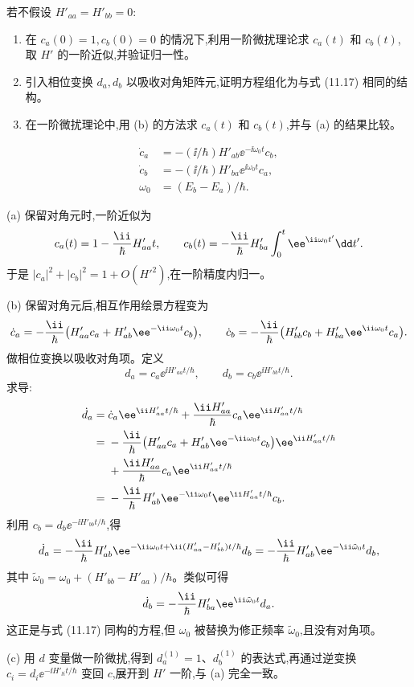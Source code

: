 \begin{question}
若不假设 $H'_{aa}=H'_{bb}=0$:
\begin{enumerate}
\item 在 $c_a(0)=1,c_b(0)=0$ 的情况下,利用一阶微扰理论求 $c_a(t)$ 和 $c_b(t)$,取 $H'$ 的一阶近似,并验证归一性。
\item 引入相位变换 $d_a,d_b$ 以吸收对角矩阵元,证明方程组化为与式 (11.17) 相同的结构。
\item 在一阶微扰理论中,用 (b) 的方法求 $c_a(t)$ 和 $c_b(t)$,并与 (a) 的结果比较。
\end{enumerate}

\par\smallskip
{}\[
\begin{aligned}\dot c_a&=-(\ii/\hbar)H'_{ab}\ee^{-\ii\omega_0t}c_b,\\\dot c_b&=-(\ii/\hbar)H'_{ba}\ee^{\ii\omega_0t}c_a,\\\omega_0&=(E_b-E_a)/\hbar.\end{aligned}\]

\begin{solution}
(a) 保留对角元时,一阶近似为
\[
c_a(t)=1-{\ii\over\hbar}H'_{aa}t,
\qquad
c_b(t)=-{\ii\over\hbar}H'_{ba}\int_0^t \ee^{\ii\omega_0t'}\dd t'.
\]
于是 $|c_a|^2+|c_b|^2=1+O(H'^2)$,在一阶精度内归一。

(b) 保留对角元后,相互作用绘景方程变为
\[
\dot c_a=-{\ii\over\hbar}\big(H'_{aa}c_a+H'_{ab}\ee^{-\ii\omega_0t}c_b\big),\qquad
\dot c_b=-{\ii\over\hbar}\big(H'_{bb}c_b+H'_{ba}\ee^{\ii\omega_0t}c_a\big).
\]
做相位变换以吸收对角项。定义
\[
d_a=c_a \ee^{\ii H'_{aa}t/\hbar},\qquad
d_b=c_b \ee^{\ii H'_{bb}t/\hbar}.
\]
求导:
\[
\begin{aligned}\dot d_a={}&\dot c_a \ee^{\ii H'_{aa}t/\hbar}+{\ii H'_{aa}\over\hbar}c_a \ee^{\ii H'_{aa}t/\hbar}\\={}&-{\ii\over\hbar}\big(H'_{aa}c_a+H'_{ab}\ee^{-\ii\omega_0t}c_b\big)\ee^{\ii H'_{aa}t/\hbar}\\&+{\ii H'_{aa}\over\hbar}c_a \ee^{\ii H'_{aa}t/\hbar}\\={}&-{\ii\over\hbar}H'_{ab}\ee^{-\ii\omega_0t}\ee^{\ii H'_{aa}t/\hbar}c_b.\end{aligned}
\]
利用 $c_b=d_b \ee^{-\ii H'_{bb}t/\hbar}$,得
\[
\dot d_a=-{\ii\over\hbar}H'_{ab}\ee^{-\ii\omega_0t+\ii(H'_{aa}-H'_{bb})t/\hbar}d_b
=-{\ii\over\hbar}H'_{ab}\ee^{-\ii\tilde\omega_0 t}d_b,
\]
其中 $\tilde\omega_0=\omega_0+(H'_{bb}-H'_{aa})/\hbar$。类似可得
\[
\dot d_b=-{\ii\over\hbar}H'_{ba}\ee^{\ii\tilde\omega_0 t}d_a.
\]
这正是与式 (11.17) 同构的方程,但 $\omega_0$ 被替换为修正频率 $\tilde\omega_0$,且没有对角项。

(c) 用 $d$ 变量做一阶微扰,得到 $d_a^{(1)}=1$、$d_b^{(1)}$ 的表达式,再通过逆变换 $c_i=d_i \ee^{-\ii H'_{\ii i}t/\hbar}$ 变回 $c$,展开到 $H'$ 一阶,与 (a) 完全一致。
\end{solution}
\end{question}

